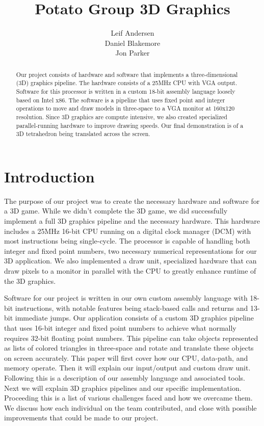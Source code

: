 \documentclass[onecolumn]{IEEEtran}
\title{Potato Group 3D Graphics}
\author{Leif Andersen\\Daniel Blakemore\\Jon Parker}
\begin{document}
\maketitle

\begin{abstract}
Our project consists of hardware and software that implements a three-dimensional (3D) graphics pipeline.  The hardware consists of a 25MHz CPU with VGA output.  Software for this processor is written in a custom 18-bit assembly language loosely based on Intel x86.  The software is a pipeline that uses fixed point and integer operations to move and draw models in three-space to a VGA monitor at 160x120 resolution.  Since 3D graphics are compute intensive, we also created specialized parallel-running hardware to improve drawing speeds.  Our final demonstration is of a 3D tetrahedron being translated across the screen.
\end{abstract}

\section{Introduction}
The purpose of our project was to create the necessary hardware and software for a 3D game.  While we didn't complete the 3D game, we did successfully implement a full 3D graphics pipeline and the necessary hardware.  This hardware includes a 25MHz 16-bit CPU running on a digital clock manager (DCM) with most instructions being single-cycle.  The processor is capable of handling both integer and fixed point numbers, two necessary numerical representations for our 3D application.  We also implemented a draw unit, specialized hardware that can draw pixels to a monitor in parallel with the CPU to greatly enhance runtime of the 3D graphics.

Software for our project is written in our own custom assembly language with 18-bit instructions, with notable features being stack-based calls and returns and 13-bit immediate jumps.  Our application consists of a custom 3D graphics pipeline that uses 16-bit integer and fixed point numbers to achieve what normally requires 32-bit floating point numbers.  This pipeline can take objects represented as lists of colored triangles in three-space and rotate and translate these objects on screen accurately.   This paper will first cover how our CPU, data-path, and memory operate.  Then it will explain our input/output and custom draw unit.  Following this is a description of our assembly language and associated tools.  Next we will explain 3D graphics pipelines and our specific implementation.  Proceeding this is a list of various challenges faced and how we overcame them.  We discuss how each individual on the team contributed, and close with possible improvements that could be made to our project.
\end{document}
